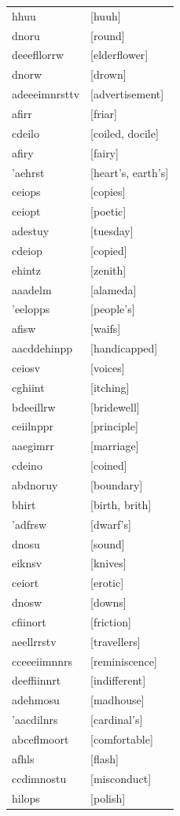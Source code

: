 \documentclass{article}
\begin{document}
\begin{tabular}{ll}
hhuu & [huuh] \\
dnoru & [round] \\
deeefllorrw & [elderflower] \\
dnorw & [drown] \\
adeeeimnrsttv & [advertisement] \\
afirr & [friar] \\
cdeilo & [coiled, docile] \\
afiry & [fairy] \\
'aehrst & [heart's, earth's] \\
ceiops & [copies] \\
ceiopt & [poetic] \\
adestuy & [tuesday] \\
cdeiop & [copied] \\
ehintz & [zenith] \\
aaadelm & [alameda] \\
'eelopps & [people's] \\
afisw & [waifs] \\
aacddehinpp & [handicapped] \\
ceiosv & [voices] \\
cghiint & [itching] \\
bdeeillrw & [bridewell] \\
ceiilnppr & [principle] \\
aaegimrr & [marriage] \\
cdeino & [coined] \\
abdnoruy & [boundary] \\
bhirt & [birth, brith] \\
'adfrsw & [dwarf's] \\
dnosu & [sound] \\
eiknsv & [knives] \\
ceiort & [erotic] \\
dnosw & [downs] \\
cfiinort & [friction] \\
aeellrrstv & [travellers] \\
cceeeiimnnrs & [reminiscence] \\
deeffiinnrt & [indifferent] \\
adehmosu & [madhouse] \\
'aacdilnrs & [cardinal's] \\
abceflmoort & [comfortable] \\
afhls & [flash] \\
ccdimnostu & [misconduct] \\
hilops & [polish] \\

\end{tabular}
\end{document}
